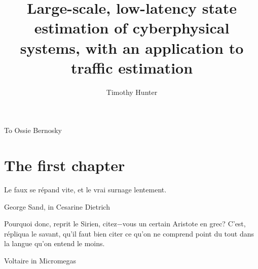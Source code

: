 \documentclass{ucbthesis}
\begin{document}

\title{Large-scale, low-latency state estimation of cyberphysical systems, with an application to traffic estimation}
\author{Timothy Hunter}




\maketitle
\approvalpage
\copyrightpage

% 

\begin{frontmatter}

\begin{dedication}
\null\vfil
\begin{center}
To Ossie Bernosky\\\vspace{12pt}
\end{center}
\vfil\null
\end{dedication}

\tableofcontents
\clearpage
\listoffigures
\clearpage
\listoftables

\begin{acknowledgements}

\end{acknowledgements}

\end{frontmatter}

\pagestyle{headings}



\chapter{The first chapter}
\epigraph{Le faux se répand vite, et le vrai surnage lentement.}{George Sand, in Cesarine Dietrich}



\epigraph{Pourquoi donc, reprit le Sirien, citez−vous un certain Aristote en grec? C'est, répliqua le savant, qu'il faut bien citer ce qu'on ne comprend point du tout dans la langue qu'on entend le moins.}{Voltaire in Micromegas}



\end{document}
